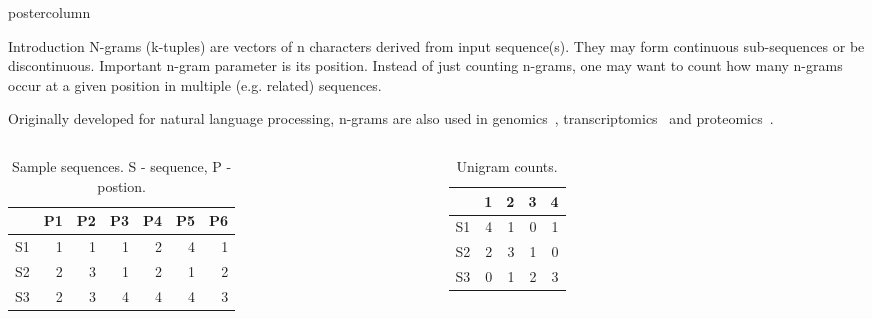 \documentclass[final]{beamer}\usepackage[]{graphicx}\usepackage[]{color}
\newlength{\columnheight}
\begin{document}
\begin{frame}
  \begin{columns}
    \begin{column}{.47\textwidth}
      \begin{beamercolorbox}[center,wd=\textwidth]{postercolumn}
        \begin{minipage}[T]{.95\textwidth}
          \parbox[t][\columnheight]{\textwidth}
            {
    
        
    \begin{block}{Introduction}
N-grams (k-tuples) are vectors of n characters derived from input sequence(s). They may form continuous sub-sequences or be discontinuous. 
Important n-gram parameter is its position. Instead of just counting n-grams, one may want to count how many n-grams occur at a given position in multiple (e.g. related) sequences.

Originally developed for natural language processing, n-grams are also used in genomics~\citep{fang2011}, transcriptomics~\citep{wang2014} and proteomics~\citep{guo2014}.

\small{
       \begin{columns}[c] %
\begin{table}[ht]
\centering
\begin{tabular}{rrrrrrr}
  \hline
 & P1 & P2 & P3 & P4 & P5 & P6 \\ 
  \hline
S1 & 1 & 1 & 1 & 2 & 4 & 1 \\ 
  S2 & 2 & 3 & 1 & 2 & 1 & 2 \\ 
  S3 & 2 & 3 & 4 & 4 & 4 & 3 \\ 
   \hline
\end{tabular}
\caption{Sample sequences.  S - sequence, P - postion.} 
\end{table}

      
      

    
\begin{table}[ht]
\centering
\begin{tabular}{rrrrr}
  \hline
 & 1 & 2 & 3 & 4 \\ 
  \hline
S1 & 4 & 1 & 0 & 1 \\ 
  S2 & 2 & 3 & 1 & 0 \\ 
  S3 & 0 & 1 & 2 & 3 \\ 
   \hline
\end{tabular}
\caption{Unigram counts.} 
\end{table}



\end{columns}}
\end{block}}
\end{minipage}
\end{beamercolorbox}
\end{column}
\end{columns}
\end{frame}
\end{document}
